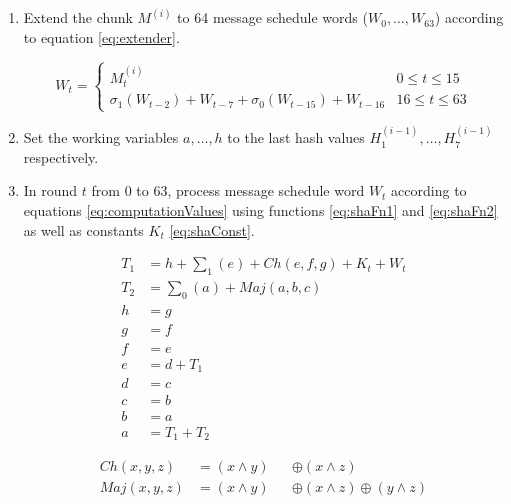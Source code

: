 \begin{enumerate}
	\item Extend the chunk $M^{(i)}$ to 64 message schedule words ($W_0,\dots, W_{63}$) according to equation \eqref{eq:extender}.
		
		\begin{equation}
		\label{eq:extender}
			W_{t}=
			\begin{cases}
				M_{t}^{(i)} & 0 \leq t \leq 15 \\
				\sigma_{1}\left(W_{t-2}\right)+W_{t-7}+\sigma_{0}\left(W_{t-15}\right)+W_{t-16} & 16 \leq t \leq 63
			\end{cases}
		\end{equation}
	
	\item Set the working variables $ a, \dots, h$ to the last hash values $H_1^{(i-1)},\dots,H_7^{(i-1)}$ respectively.
	
	\item In round $t$ from 0 to 63, process message schedule word $W_t$ according to equations \eqref{eq:computationValues} using functions \eqref{eq:shaFn1} and \eqref{eq:shaFn2} as well as constants $K_t$ \eqref{eq:shaConst}.
	
		\begin{equation}
		\label{eq:computationValues}			
			\begin{aligned}
				T_{1} &= h+\sum\nolimits_{1}(e)+C h(e, f, g)+K_{t}+W_{t} \\
				T_{2} &= \sum\nolimits_{0}(a)+M a j(a, b, c) \\
				h&=g \\	
				g&=f \\
				f&=e \\
				e&=d+T_{1} \\
				d&=c \\
				c&=b \\
				b&=a \\
				a&=T_{1}+T_{2}
			\end{aligned}
		\end{equation}

	\begin{equation}
	\label{eq:shaFn1}
	\begin{aligned}
		Ch(x, y, z) &= (x \wedge y) &&\oplus(x \wedge z) \\
		Maj(x, y, z) &= (x \wedge y) &&\oplus(x \wedge z) \oplus(y \wedge z)
	\end{aligned}
	\end{equation}
	

\end{enumerate}
